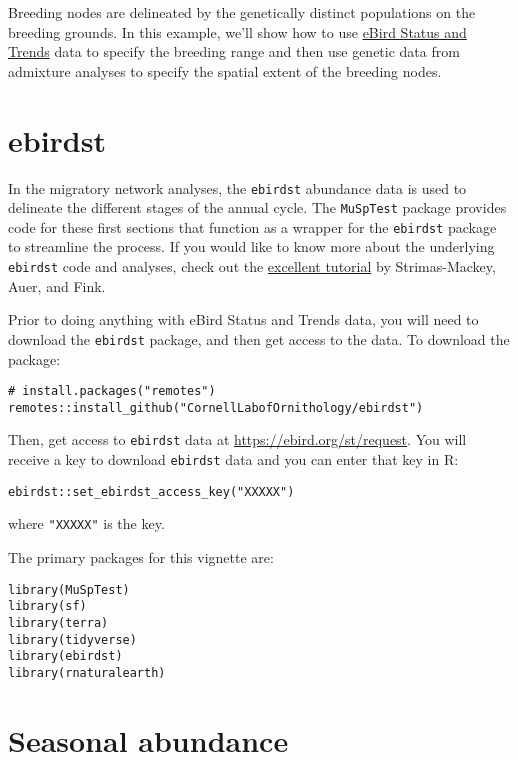 \documentclass[
]{book}
\begin{document}
Breeding nodes are delineated by the genetically distinct populations on the breeding grounds. In this example, we'll show how to use \href{https://ebird.org/science/status-and-trends}{eBird Status and Trends} data to specify the breeding range and then use genetic data from admixture analyses to specify the spatial extent of the breeding nodes.

\hypertarget{ebirdst}{%
\section{ebirdst}\label{ebirdst}}

In the migratory network analyses, the \texttt{ebirdst} abundance data is used to delineate the different stages of the annual cycle. The \texttt{MuSpTest} package provides code for these first sections that function as a wrapper for the \texttt{ebirdst} package to streamline the process. If you would like to know more about the underlying \texttt{ebirdst} code and analyses, check out the \href{https://cornelllabofornithology.github.io/ebirdst/articles/ebirdst-advanced-mapping.html}{excellent tutorial} by Strimas-Mackey, Auer, and Fink.

Prior to doing anything with eBird Status and Trends data, you will need to download the \texttt{ebirdst} package, and then get access to the data. To download the package:

\begin{verbatim}
# install.packages("remotes")
remotes::install_github("CornellLabofOrnithology/ebirdst")
\end{verbatim}

Then, get access to \texttt{ebirdst} data at \url{https://ebird.org/st/request}. You will receive a key to download \texttt{ebirdst} data and you can enter that key in R:

\begin{verbatim}
ebirdst::set_ebirdst_access_key("XXXXX")
\end{verbatim}

where \texttt{"XXXXX"} is the key.

The primary packages for this vignette are:

\begin{verbatim}
library(MuSpTest)
library(sf)
library(terra)
library(tidyverse)
library(ebirdst)
library(rnaturalearth)
\end{verbatim}

\hypertarget{seasonal-abundance}{%
\section{Seasonal abundance}\label{seasonal-abundance}}
\end{document}
